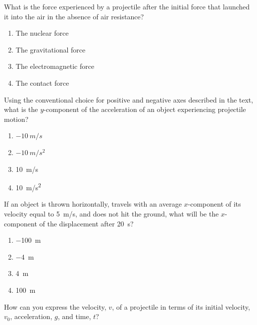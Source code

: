 \documentclass[main-physics.tex]{subfiles}
\begin{document}
\begin{exercise} \label{uLtw6P}
    What is the force experienced by a projectile after the initial force that launched it into the air in the absence of air resistance?

    \begin{enumerate}[label=\Alph*.]
        \item The nuclear force
        \item The gravitational force
        \item The electromagnetic force
        \item The contact force
    \end{enumerate}
\end{exercise}

\begin{exercise} \label{YYBBp5}
    Using the conventional choice for positive and negative axes described in the text, what is the $y$-component of the acceleration of an object experiencing projectile motion?
\end{exercise}

\begin{enumerate}[label=\Alph*.]
    \item $\SI{-10}{m/s}$
    \item $\SI{-10}{m/s^2}$
    \item \SI{10}{m/s}
    \item \SI{10}{m/s^2}
\end{enumerate}

\begin{exercise} \label{EykTi8}
    If an object is thrown horizontally, travels with an average $x$-component of its velocity equal to \SI{5}{m/s}, and does not hit the ground, what will be the $x$-component of the displacement after \SI{20}{s}? 

    \begin{enumerate}[label=\Alph*.]
        \item \SI{-100}{m}
        \item \SI{-4}{m}
        \item \SI{4}{m}
        \item \SI{100}{m}
    \end{enumerate}
\end{exercise}

\begin{exercise} \label{wlbvvu}
    How can you express the velocity, $v$, of a projectile in terms of its initial velocity, $v_0$, acceleration, $g$, and time, $t$?
\end{exercise}
\end{document}
